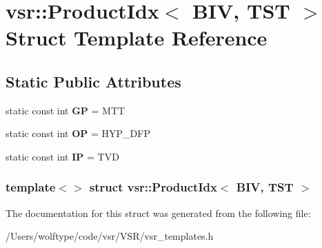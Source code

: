 \hypertarget{structvsr_1_1_product_idx_3_01_b_i_v_00_01_t_s_t_01_4}{\section{vsr\-:\-:Product\-Idx$<$ B\-I\-V, T\-S\-T $>$ Struct Template Reference}
\label{structvsr_1_1_product_idx_3_01_b_i_v_00_01_t_s_t_01_4}
}
\subsection*{Static Public Attributes}
\begin{DoxyCompactItemize}
\item 
\hypertarget{structvsr_1_1_product_idx_3_01_b_i_v_00_01_t_s_t_01_4_a3115c3003e86b1b349795376db135c1f}{static const int {\bfseries G\-P} = M\-T\-T}\label{structvsr_1_1_product_idx_3_01_b_i_v_00_01_t_s_t_01_4_a3115c3003e86b1b349795376db135c1f}

\item 
\hypertarget{structvsr_1_1_product_idx_3_01_b_i_v_00_01_t_s_t_01_4_abd8dc4c196810675ba4783815164461d}{static const int {\bfseries O\-P} = H\-Y\-P\-\_\-\-D\-F\-P}\label{structvsr_1_1_product_idx_3_01_b_i_v_00_01_t_s_t_01_4_abd8dc4c196810675ba4783815164461d}

\item 
\hypertarget{structvsr_1_1_product_idx_3_01_b_i_v_00_01_t_s_t_01_4_a06551835a82930a29c0ab24ee31cb973}{static const int {\bfseries I\-P} = T\-V\-D}\label{structvsr_1_1_product_idx_3_01_b_i_v_00_01_t_s_t_01_4_a06551835a82930a29c0ab24ee31cb973}

\end{DoxyCompactItemize}
\subsubsection*{template$<$$>$ struct vsr\-::\-Product\-Idx$<$ B\-I\-V, T\-S\-T $>$}



The documentation for this struct was generated from the following file\-:\begin{DoxyCompactItemize}
\item 
/\-Users/wolftype/code/vsr/\-V\-S\-R/vsr\-\_\-templates.\-h\end{DoxyCompactItemize}
